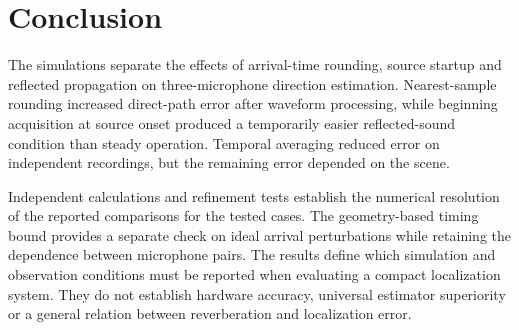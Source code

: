 \documentclass{edpsci}
\begin{document}
\section{Conclusion}

The simulations separate the effects of arrival-time rounding, source startup and reflected propagation on three-microphone direction estimation. Nearest-sample rounding increased direct-path error after waveform processing, while beginning acquisition at source onset produced a temporarily easier reflected-sound condition than steady operation. Temporal averaging reduced error on independent recordings, but the remaining error depended on the scene.

Independent calculations and refinement tests establish the numerical resolution of the reported comparisons for the tested cases. The geometry-based timing bound provides a separate check on ideal arrival perturbations while retaining the dependence between microphone pairs. The results define which simulation and observation conditions must be reported when evaluating a compact localization system. They do not establish hardware accuracy, universal estimator superiority or a general relation between reverberation and localization error.



\balance
\begingroup{}

\endgroup
\end{document}
